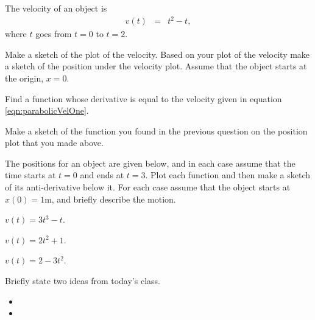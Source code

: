 \begin{problem}
\item The velocity of an object is
  \begin{eqnarray}
    \label{eqn:parabolicVelOne}
    v(t) & = & t^2 - t,
  \end{eqnarray}
  where $t$ goes from $t=0$ to $t=2$.

  \begin{subproblem}
  \item Make a sketch of the plot of the velocity.  Based on your plot
    of the velocity make a sketch of the position under the velocity
    plot. Assume that the object starts at the origin, $x=0$.

    \vfill

  \item Find a function whose derivative is equal to the velocity
    given in equation \ref{eqn:parabolicVelOne}.

    \vspace{3em}

  \item Make a sketch of the function you found in the previous
    question on the position plot that you made above.

  \end{subproblem}

  \clearpage

\item The positions for an object are given below, and in each case
  assume that the time starts at $t=0$ and ends at $t=3$. Plot each
  function and then make a sketch of its anti-derivative below it.
  For each case assume that the object starts at $x(0)=1$m, and
  briefly describe the motion.

  \begin{subproblem}
    \item $v(t)= 3t^3-t$.
      \vfill
    \item $v(t)=2t^2 + 1$.
      \vfill
    \item $v(t)=2-3t^2$.
      \vfill
  \end{subproblem}

\end{problem}

\postClass

\begin{problem}
\item Briefly state two ideas from today's class.
  \begin{itemize}
  \item 
  \item 
  \end{itemize}
\item 
  \begin{subproblem}
    \item
  \end{subproblem}
\end{problem}



